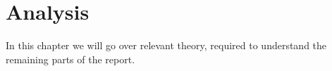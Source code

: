 \chapter{Analysis} \label{cha:analysis}
In this chapter we will go over relevant theory, required to understand the remaining parts of the report.




